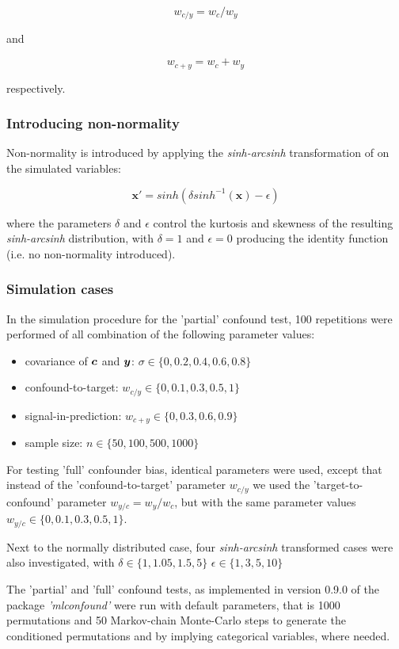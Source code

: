 \documentclass{article}
\begin{document}
$$ w_{c/y} = w_c / w_y $$

and

$$ w_{c+y} = w_c + w_y $$

respectively.

\subsubsection*{Introducing non-normality}

Non-normality is introduced by applying the \emph{sinh-arcsinh} transformation of \cite{jones2009sinh} on the simulated variables:

$$\boldsymbol{x}' = sinh(\delta sinh^{-1}(\boldsymbol{x}) - \epsilon)$$

where the parameters $\delta$ and $\epsilon$ control the kurtosis and skewness of the resulting \emph{sinh-arcsinh} distribution, with $\delta=1$ and $\epsilon=0$ producing the identity function (i.e. no non-normality introduced).

\subsubsection*{Simulation cases}

In the simulation procedure for the 'partial' confound test, 100 repetitions were performed of all combination of the following parameter values: 
\begin{itemize}
    \item covariance of $\boldsymbol{c}$ and $\boldsymbol{y}$: $\sigma \in \{0, 0.2, 0.4, 0.6, 0.8\}$
    \item confound-to-target: $w_{c/y} \in \{0, 0.1, 0.3, 0.5, 1\}$
    \item signal-in-prediction: $w_{c+y} \in \{0, 0.3, 0.6, 0.9\}$
    \item sample size: $n \in \{50, 100, 500, 1000\}$
\end{itemize}

For testing 'full' confounder bias, identical parameters were used, except that instead of the 'confound-to-target' parameter $ w_{c/y}$ we used the 'target-to-confound' parameter $ w_{y/c} = w_y/ w_c $, but with the same parameter values $w_{y/c} \in \{0, 0.1, 0.3, 0.5, 1\}$.

Next to the normally distributed case, four \emph{sinh-arcsinh} transformed cases were also investigated, with $\delta \in \{1, 1.05, 1.5, 5\}$ $\epsilon \in \{1, 3, 5, 10\}$ 

The 'partial' and 'full' confound tests, as implemented in version 0.9.0 of the package \emph{'mlconfound'} were run with default parameters, that is 1000 permutations and 50 Markov-chain Monte-Carlo steps to generate the conditioned permutations and by implying categorical variables, where needed.
\end{document}

